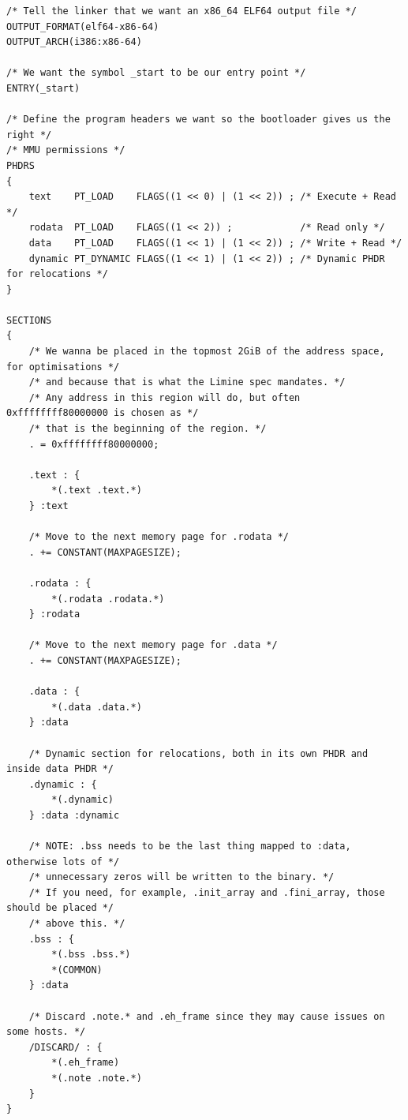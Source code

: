\documentclass[../main.tex]{subfiles}
\begin{document}
\label{lst:linker_ld}
\begin{verbatim}
/* Tell the linker that we want an x86_64 ELF64 output file */
OUTPUT_FORMAT(elf64-x86-64)
OUTPUT_ARCH(i386:x86-64)
 
/* We want the symbol _start to be our entry point */
ENTRY(_start)
 
/* Define the program headers we want so the bootloader gives us the right */
/* MMU permissions */
PHDRS
{
    text    PT_LOAD    FLAGS((1 << 0) | (1 << 2)) ; /* Execute + Read */
    rodata  PT_LOAD    FLAGS((1 << 2)) ;            /* Read only */
    data    PT_LOAD    FLAGS((1 << 1) | (1 << 2)) ; /* Write + Read */
    dynamic PT_DYNAMIC FLAGS((1 << 1) | (1 << 2)) ; /* Dynamic PHDR for relocations */
}
 
SECTIONS
{
    /* We wanna be placed in the topmost 2GiB of the address space, for optimisations */
    /* and because that is what the Limine spec mandates. */
    /* Any address in this region will do, but often 0xffffffff80000000 is chosen as */
    /* that is the beginning of the region. */
    . = 0xffffffff80000000;
 
    .text : {
        *(.text .text.*)
    } :text
 
    /* Move to the next memory page for .rodata */
    . += CONSTANT(MAXPAGESIZE);
 
    .rodata : {
        *(.rodata .rodata.*)
    } :rodata
 
    /* Move to the next memory page for .data */
    . += CONSTANT(MAXPAGESIZE);
 
    .data : {
        *(.data .data.*)
    } :data
 
    /* Dynamic section for relocations, both in its own PHDR and inside data PHDR */
    .dynamic : {
        *(.dynamic)
    } :data :dynamic
 
    /* NOTE: .bss needs to be the last thing mapped to :data, otherwise lots of */
    /* unnecessary zeros will be written to the binary. */
    /* If you need, for example, .init_array and .fini_array, those should be placed */
    /* above this. */
    .bss : {
        *(.bss .bss.*)
        *(COMMON)
    } :data
 
    /* Discard .note.* and .eh_frame since they may cause issues on some hosts. */
    /DISCARD/ : {
        *(.eh_frame)
        *(.note .note.*)
    }
}
\end{verbatim}
\end{document}
